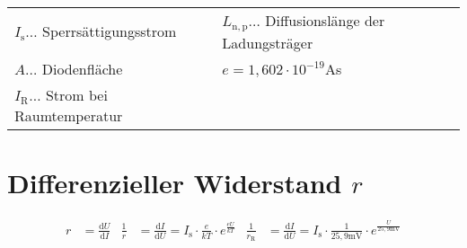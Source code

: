 		\begin{table}[h]
		\begin{tabular}{ll}
		$I_{\mathrm{s}}\dots$ Sperrsättigungsstrom & $L_{\mathrm{n,p}}\dots$ Diffusionslänge der Ladungsträger\\
		$A\dots$ Diodenfläche & $e=1,602\cdot10^{-19}$As\\
		$I_{\mathrm{R}}\dots$ Strom bei Raumtemperatur & \\
		\end{tabular}
		\end{table}
	
	\section{Differenzieller Widerstand $r$}
		\begin{align*}
			r&=\frac{\mathrm{d}U}{\mathrm{d}I} 
			& \frac{1}{r}&=\frac{\mathrm{d}I}{\mathrm{d}U}=I_{\mathrm{s}}\cdot\frac{e}{kT}\cdot e^{\frac{eU}{kT}}
			& \frac{1}{r_{\mathrm{R}}}&=\frac{\mathrm{d}I}{\mathrm{d}U}=I_{\mathrm{s}}\cdot\frac{1}{25,9{\mathrm{mV}}}\cdot e^{\frac{U}{25,9\mathrm{mV}}}
		\end{align*}

\clearpage

